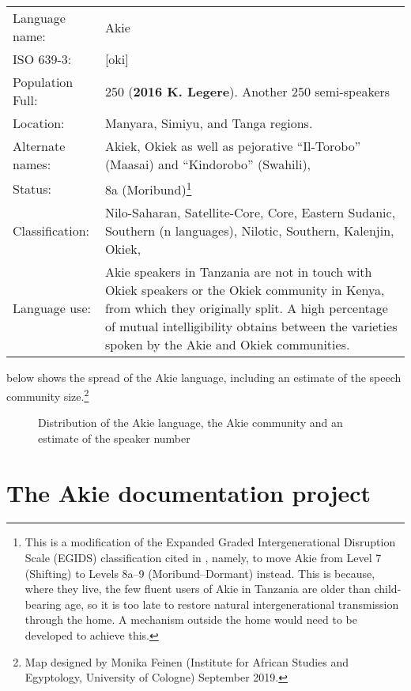 \documentclass[output=paper,colorlinks,citecolor=brown]{langscibook}
\begin{document}
\begin{tabular}{p{3cm} p{8cm}}
Language name: & Akie \\
ISO 639-3: &  	 [oki] \\
Population Full:	&  250 (\textbf{2016 K. Legere}). Another 250 semi-speakers \\
Location:	& 	Manyara, Simiyu, and Tanga regions. \\
Alternate names: & Akiek, Okiek as well as pejorative “Il-Torobo” (Maasai) and “Kindorobo” (Swahili), \\
Status: & 	8a (Moribund)\footnote{This is a modification of the Expanded Graded Intergenerational Disruption Scale (EGIDS) classification cited in \citet[7]{SimonsFennig2018}, namely, to move Akie from Level 7 (Shifting) to Levels 8a–9 (Moribund–Dormant) instead. This is because, where they live, the few fluent users of Akie in Tanzania are older than child-bearing age, so it is too late to restore natural intergenerational transmission through the home. A mechanism outside the home would need to be developed to achieve this.} \\
Classification:	 & Nilo-Saharan, Satellite-Core, Core, Eastern Sudanic, Southern (n languages), Nilotic, Southern, Kalenjin, Okiek, \\
Language use: & 	Akie speakers in Tanzania are not in touch with Okiek speakers or the Okiek community in Kenya, from which they originally split. A high percentage of mutual intelligibility obtains between the varieties spoken by the Akie and Okiek communities. \\
\end{tabular}

 below shows the spread of the Akie language, including an estimate of the speech community size.\footnote{Map designed by Monika Feinen (Institute for African Studies and Egyptology, University of Cologne) September 2019.}


\begin{figure}
    \caption{Distribution of the Akie language, the Akie community and an estimate of the speaker number}
    \label{fig:legere:1}
\end{figure}

\section{The Akie documentation project}\label{sec:legere:2}
\end{document}
